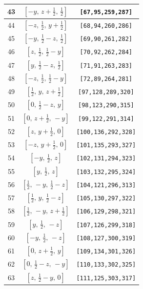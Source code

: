 \documentclass[fleqn,8pt]{jsarticle}
\begin{document}
\begin{longtable}{ccc}
43 & $\left[ - y,\, z + \frac{1}{2},\, \frac{1}{2} \right]$ & {\tt [67,95,259,287]} \\ \hline
44 & $\left[ - z,\, \frac{1}{2},\, y + \frac{1}{2} \right]$ & {\tt [68,94,260,286]} \\ \hline
45 & $\left[ - y,\, \frac{1}{2} - z,\, \frac{1}{2} \right]$ & {\tt [69,90,261,282]} \\ \hline
46 & $\left[ z,\, \frac{1}{2},\, \frac{1}{2} - y \right]$ & {\tt [70,92,262,284]} \\ \hline
47 & $\left[ y,\, \frac{1}{2} - z,\, \frac{1}{2} \right]$ & {\tt [71,91,263,283]} \\ \hline
48 & $\left[ - z,\, \frac{1}{2},\, \frac{1}{2} - y \right]$ & {\tt [72,89,264,281]} \\ \hline
49 & $\left[ \frac{1}{2},\, y,\, z + \frac{1}{2} \right]$ & {\tt [97,128,289,320]} \\ \hline
50 & $\left[ 0,\, \frac{1}{2} - z,\, y \right]$ & {\tt [98,123,290,315]} \\ \hline
51 & $\left[ 0,\, z + \frac{1}{2},\, - y \right]$ & {\tt [99,122,291,314]} \\ \hline
52 & $\left[ z,\, y + \frac{1}{2},\, 0 \right]$ & {\tt [100,136,292,328]} \\ \hline
53 & $\left[ - z,\, y + \frac{1}{2},\, 0 \right]$ & {\tt [101,135,293,327]} \\ \hline
54 & $\left[ - y,\, \frac{1}{2},\, z \right]$ & {\tt [102,131,294,323]} \\ \hline
55 & $\left[ y,\, \frac{1}{2},\, z \right]$ & {\tt [103,132,295,324]} \\ \hline
56 & $\left[ \frac{1}{2},\, - y,\, \frac{1}{2} - z \right]$ & {\tt [104,121,296,313]} \\ \hline
57 & $\left[ \frac{1}{2},\, y,\, \frac{1}{2} - z \right]$ & {\tt [105,130,297,322]} \\ \hline
58 & $\left[ \frac{1}{2},\, - y,\, z + \frac{1}{2} \right]$ & {\tt [106,129,298,321]} \\ \hline
59 & $\left[ y,\, \frac{1}{2},\, - z \right]$ & {\tt [107,126,299,318]} \\ \hline
60 & $\left[ - y,\, \frac{1}{2},\, - z \right]$ & {\tt [108,127,300,319]} \\ \hline
61 & $\left[ 0,\, z + \frac{1}{2},\, y \right]$ & {\tt [109,134,301,326]} \\ \hline
62 & $\left[ 0,\, \frac{1}{2} - z,\, - y \right]$ & {\tt [110,133,302,325]} \\ \hline
63 & $\left[ z,\, \frac{1}{2} - y,\, 0 \right]$ & {\tt [111,125,303,317]} \\ \hline

\end{longtable}
\end{document}
